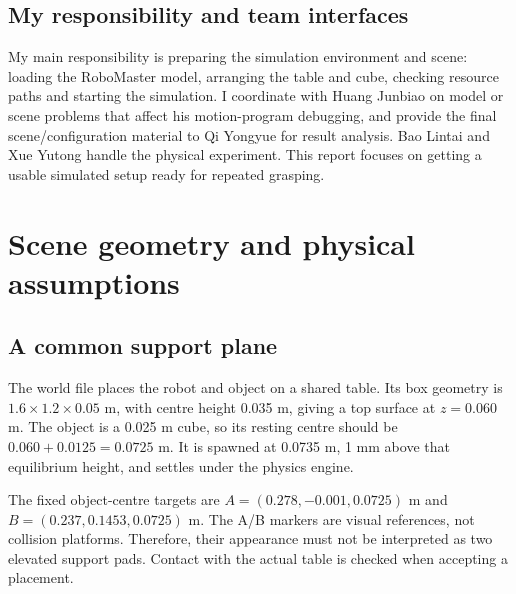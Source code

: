 
\newcommand{\studentname}{Ning Bo}
\newcommand{\studentcn}{宁博}
\newcommand{\studentid}{24020036049}

\commonrequirements
\subsection{My responsibility and team interfaces}
My main responsibility is preparing the simulation environment and scene: loading the RoboMaster model, arranging the table and cube, checking resource paths and starting the simulation. I coordinate with Huang Junbiao on model or scene problems that affect his motion-program debugging, and provide the final scene/configuration material to Qi Yongyue for result analysis. Bao Lintai and Xue Yutong handle the physical experiment. This report focuses on getting a usable simulated setup ready for repeated grasping.
\teamtable
\commonlimits
\clearpage
\section{Scene geometry and physical assumptions}
\subsection{A common support plane}
The world file places the robot and object on a shared table. Its box geometry is $1.6\times1.2\times0.05$ m, with centre height 0.035 m, giving a top surface at $z=0.060$ m. The object is a 0.025 m cube, so its resting centre should be $0.060+0.0125=0.0725$ m. It is spawned at 0.0735 m, 1 mm above that equilibrium height, and settles under the physics engine.
\begin{center}
\end{center}
The fixed object-centre targets are $A=(0.278,-0.001,0.0725)$ m and $B=(0.237,0.1453,0.0725)$ m. The A/B markers are visual references, not collision platforms. Therefore, their appearance must not be interpreted as two elevated support pads. Contact with the actual table is checked when accepting a placement.
